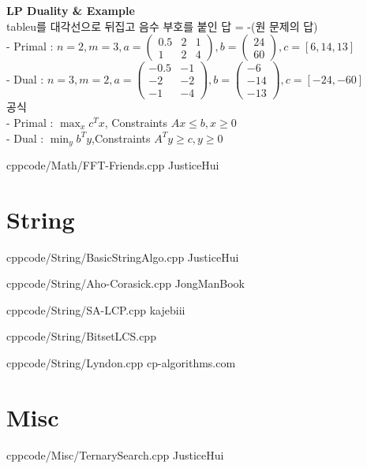 \documentclass[landscape, 8pt, a4paper, oneside, twocolumn]{extarticle}
\begin{document}
\noindent
\textbf{LP Duality \& Example}\\
tableu를 대각선으로 뒤집고 음수 부호를 붙인 답 = -(원 문제의 답)\\
- Primal : $n = 2, m = 3, a = \begin{pmatrix} 0.5 & 2 & 1 \\ 1 & 2 & 4 \end{pmatrix}, b = \begin{pmatrix} 24 \\ 60 \end{pmatrix}, c = [6, 14, 13]$\\
- Dual : $n = 3, m = 2, a = \begin{pmatrix} -0.5 & -1 \\ -2 & -2 \\ -1 & -4 \end{pmatrix}, b = \begin{pmatrix} -6 \\ -14 \\ -13 \end{pmatrix}, c = [-24, -60]$\\
공식\\
- Primal : $\max_{x} c^Tx$, Constraints $Ax \leq b, x \geq 0$\\
- Dual : $\min_{y} b^Ty$,Constraints $A^Ty \geq c, y \geq 0$ 


{}{}
{cpp}{code/Math/FFT-Friends.cpp}
{JusticeHui}

\section{String}

{}{}
{cpp}{code/String/BasicStringAlgo.cpp}
{JusticeHui}

{}{}
{cpp}{code/String/Aho-Corasick.cpp}
{JongManBook}

{}{}
{cpp}{code/String/SA-LCP.cpp}
{kajebiii}

{}{}
{cpp}{code/String/BitsetLCS.cpp}

{}{}
{cpp}{code/String/Lyndon.cpp}
{cp-algorithms.com}

\section{Misc}

{}{}
{cpp}{code/Misc/TernarySearch.cpp}
{JusticeHui}
\end{document}

